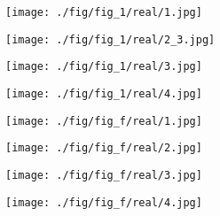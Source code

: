 \documentclass{article}
\begin{document}
\begin{figure*}[t!h]
		\begin{minipage}[c]{0.01\textwidth}
		\end{minipage}
		\hfill
		\begin{minipage}{0.115\textwidth}\texttt{[image: ./fig/fig\_1/real/1.jpg]}
		\end{minipage}
		\hfill
		\begin{minipage}{0.115\textwidth}
			\texttt{[image: ./fig/fig\_1/real/2\_3.jpg]}
		\end{minipage}
		\hfill
		\begin{minipage}{0.115\textwidth}
			\texttt{[image: ./fig/fig\_1/real/3.jpg]}
		\end{minipage}
		\hfill
		\begin{minipage}{0.115\textwidth}
			\texttt{[image: ./fig/fig\_1/real/4.jpg]}
		\end{minipage}
\hspace{1pt}
		\begin{minipage}{0.115\textwidth}
			\texttt{[image: ./fig/fig\_f/real/1.jpg]}
		\end{minipage}
		\hfill
		\begin{minipage}{0.115\textwidth}
			\texttt{[image: ./fig/fig\_f/real/2.jpg]}
		\end{minipage}
		\hfill
		\begin{minipage}{0.115\textwidth}
			\texttt{[image: ./fig/fig\_f/real/3.jpg]}
		\end{minipage}
		\hfill
		\begin{minipage}{0.115\textwidth}
			\texttt{[image: ./fig/fig\_f/real/4.jpg]}
		\end{minipage}
		\vspace{5pt}
		

\end{figure*}
\end{document}
